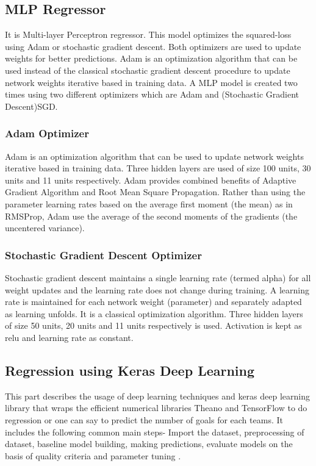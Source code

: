 \subsection{MLP Regressor}
It is Multi-layer Perceptron regressor. This model optimizes the squared-loss using Adam or stochastic gradient descent. Both optimizers are used to update weights for better predictions. Adam is an optimization algorithm that can be used instead of the classical stochastic gradient descent procedure to update network weights iterative based in training data. A MLP model is created two times using two different optimizers which are Adam and (Stochastic Gradient Descent)SGD.\newline
\subsubsection{Adam Optimizer }
Adam is an optimization algorithm that can be used to update network weights iterative based in training data. Three hidden layers are used of size 100 units, 30 units and 11 units respectively. Adam provides combined benefits of Adaptive Gradient Algorithm and Root Mean Square Propagation. Rather than using the parameter learning rates based on the average first moment (the mean) as in RMSProp, Adam use the average of the second moments of the gradients (the uncentered variance).\newline
\subsubsection{Stochastic Gradient Descent Optimizer }
Stochastic gradient descent maintains a single learning rate (termed alpha) for all weight updates and the learning rate does not change during training. A learning rate is maintained for each network weight (parameter) and separately adapted as learning unfolds. It is a classical optimization algorithm. Three hidden layers of size 50 units, 20 units and 11 units respectively is used. Activation is kept as relu and learning rate as constant.\newline
\subsection{Regression using Keras Deep Learning }
This part describes the usage of deep learning techniques and keras deep learning library that wraps the efficient numerical libraries Theano and TensorFlow to do regression or one can say to predict the number of goals for each teams. It includes the following common main steps- Import the dataset, preprocessing of dataset, baseline model building, making predictions, evaluate models on the basis of quality criteria and parameter tuning 
\cite{tensorflow:tutorial} \cite{tensorflow:keras}.\newline
